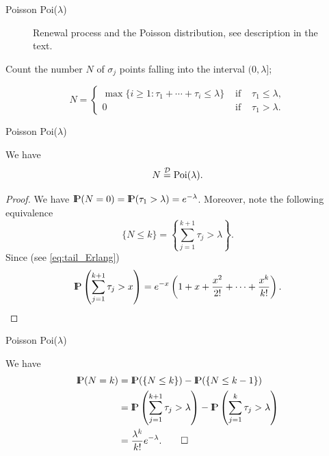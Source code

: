 \documentclass[aspectratio=169]{beamer}
\newcommand{\Prob}{{\rm I\hspace{-0.8mm}P}}
\begin{document}
\begin{frame}{Poisson Poi($\lambda$)}
\begin{figure}[H]
\caption{Renewal process and the Poisson distribution, see description in the text.}
\label{rys2-Poisson}
\end{figure}


Count the number $ N $ of $ \sigma_j $ points falling into the interval
$(0,\lambda]$;

\begin{equation}\label{e:Npoi}
N=\left\{
\begin{array}{ccc}
\max\{i\geq 1:\tau_1+\cdots+\tau_i\le \lambda\} & \textrm{ if } &\tau_1\le \lambda, \\[9pt]
0 &\textrm{ if }  &\tau_1>\lambda.
\end{array}
\right.
\end{equation}

\end{frame}



\begin{frame}{Poisson Poi($\lambda$)}


\begin{myProp} We have
$$N\stackrel{\cal D}{=} {\rm Poi}(\lambda).$$
\end{myProp}

\begin{proof}
\par\pause
We have $\Prob(N=0)=\Prob(\tau_1> \lambda)=e^{-\lambda}$. Moreover,
note the following equivalence
$$\{N\le k\}=\left\{\sum_{j=1}^{k+1}\tau_j> \lambda\right\}.$$
\noindent
Since (see \eqref{eq:tail_Erlang})
$$\Prob\left(\sum_{j=1}^{k+1}\tau_j>x\right)=
e^{-  x}\left(1+x+\frac{x^2}{2!}+\cdots+\frac{x^k}{k!}\right).$$
\end{proof}
\end{frame}



\begin{frame}{Poisson Poi($\lambda$)}


We have
\begin{align*}
\Prob(N=k)&=\Prob(\{N\le k\})-\Prob(\{N\le k-1\})\\
&= \Prob\left(\sum_{j=1}^{k+1}\tau_j>\lambda\right)-\Prob\left(\sum_{j=1}^{k}\tau_j>\lambda\right)\\
&= \frac{\lambda^k}{k!}e^{-\lambda}.\tag*{$\square$}
\end{align*}

\end{frame}
\end{document}
